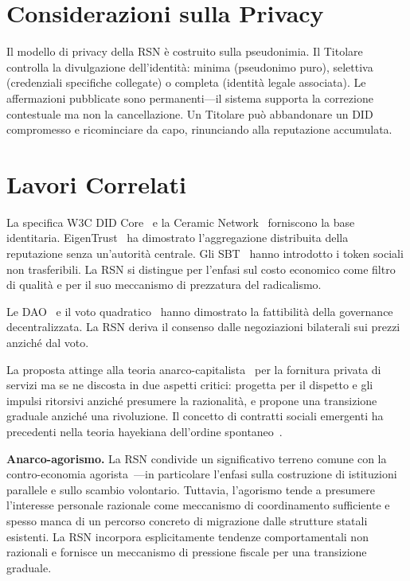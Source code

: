 \documentclass[11pt,a4paper,twocolumn]{article}
\begin{document}
\section{Considerazioni sulla Privacy}

Il modello di privacy della RSN è costruito sulla pseudonimia. Il Titolare controlla la divulgazione dell'identità: minima (pseudonimo puro), selettiva (credenziali specifiche collegate) o completa (identità legale associata). Le affermazioni pubblicate sono permanenti---il sistema supporta la correzione contestuale ma non la cancellazione. Un Titolare può abbandonare un DID compromesso e ricominciare da capo, rinunciando alla reputazione accumulata.

\section{Lavori Correlati}

La specifica W3C DID Core~\cite{did2022} e la Ceramic Network~\cite{ceramic2023} forniscono la base identitaria. EigenTrust~\cite{kamvar2003} ha dimostrato l'aggregazione distribuita della reputazione senza un'autorità centrale. Gli SBT~\cite{weyl2022} hanno introdotto i token sociali non trasferibili. La RSN si distingue per l'enfasi sul costo economico come filtro di qualità e per il suo meccanismo di prezzatura del radicalismo.

Le DAO~\cite{buterin2014} e il voto quadratico~\cite{buterin2019} hanno dimostrato la fattibilità della governance decentralizzata. La RSN deriva il consenso dalle negoziazioni bilaterali sui prezzi anziché dal voto.

La proposta attinge alla teoria anarco-capitalista~\cite{rothbard1973,hoppe2001} per la fornitura privata di servizi ma se ne discosta in due aspetti critici: progetta per il dispetto e gli impulsi ritorsivi anziché presumere la razionalità, e propone una transizione graduale anziché una rivoluzione. Il concetto di contratti sociali emergenti ha precedenti nella teoria hayekiana dell'ordine spontaneo~\cite{hayek1973}.

\textbf{Anarco-agorismo.} La RSN condivide un significativo terreno comune con la contro-economia agorista~\cite{konkin2006}---in particolare l'enfasi sulla costruzione di istituzioni parallele e sullo scambio volontario. Tuttavia, l'agorismo tende a presumere l'interesse personale razionale come meccanismo di coordinamento sufficiente e spesso manca di un percorso concreto di migrazione dalle strutture statali esistenti. La RSN incorpora esplicitamente tendenze comportamentali non razionali e fornisce un meccanismo di pressione fiscale per una transizione graduale.
\end{document}
